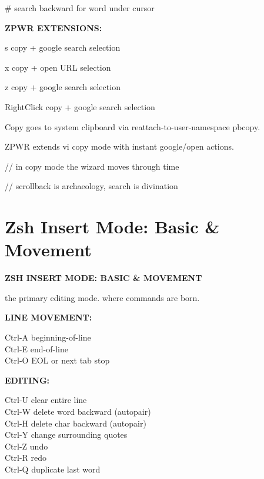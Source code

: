 \documentclass[11pt,a4paper,twoside]{book}
\begin{document}
\#                     search backward for word under cursor


\vspace{12pt}
{\bfseries\color{neonyellow} ZPWR EXTENSIONS:}\vspace{4pt}

s                     copy + google search selection

x                     copy + open URL selection

z                     copy + google search selection

RightClick            copy + google search selection

Copy goes to system clipboard via reattach-to-user-namespace pbcopy.

ZPWR extends vi copy mode with instant google/open actions.

// in copy mode the wizard moves through time

// scrollback is archaeology, search is divination


\vspace{16pt}

\section{Zsh Insert Mode: Basic \& Movement}


\vspace{10pt}
{\large\bfseries\color{neoncyan} ZSH INSERT MODE: BASIC \& MOVEMENT}\vspace{6pt}

the primary editing mode. where commands are born.


\vspace{12pt}
{\bfseries\color{neonyellow} LINE MOVEMENT:}\vspace{4pt}

\begin{codebox}
Ctrl-A                beginning-of-line\\
Ctrl-E                end-of-line\\
Ctrl-O                EOL or next tab stop\\
\end{codebox}


\vspace{12pt}
{\bfseries\color{neonyellow} EDITING:}\vspace{4pt}

\begin{codebox}
Ctrl-U                clear entire line\\
Ctrl-W                delete word backward (autopair)\\
Ctrl-H                delete char backward (autopair)\\
Ctrl-Y                change surrounding quotes\\
Ctrl-Z                undo\\
Ctrl-R                redo\\
Ctrl-Q                duplicate last word\\
\end{codebox}
\end{document}
